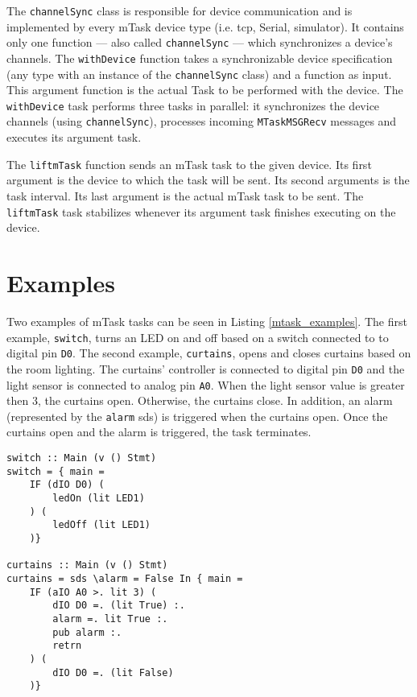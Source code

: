 The \texttt{channelSync} class is responsible for device communication and is implemented by every \gls{mTask} device type (i.e. \acs{tcp}, Serial, simulator). It contains only one function --- also called \texttt{channelSync} --- 
which synchronizes a device's channels. The \texttt{withDevice} function takes a synchronizable device specification (any type with an instance of the \texttt{channelSync} class) and a function as input. This argument function is the actual Task to be performed with the device. The \texttt{withDevice} task performs three tasks in parallel: it synchronizes the device channels (using \texttt{channelSync}), processes incoming \texttt{MTaskMSGRecv} messages and executes its argument task. 

The \texttt{liftmTask} function sends an \gls{mTask} task to the given device. Its first argument is the device to which the task will be sent. Its second arguments is the task interval. Its last argument is the actual \gls{mTask} task to be sent. The \texttt{liftmTask} task stabilizes whenever its argument task finishes executing on the device. 

\section{Examples}

Two examples of \gls{mTask} tasks can be seen in Listing \ref{mtask_examples}. The first example, \texttt{switch}, turns an LED on and off based on a switch connected to to digital pin \texttt{D0}. The second example, \texttt{curtains}, opens and closes curtains based on the room lighting. The curtains' controller is connected to digital pin \texttt{D0} and the light sensor is connected to analog pin \texttt{A0}. When the light sensor value is greater then 3, the curtains open. Otherwise, the curtains close. In addition, an alarm (represented by the \texttt{alarm} \ac{sds}) is triggered when the curtains open. Once the curtains open and the alarm is triggered, the task terminates.

\begin{lstlisting}[caption=Examples of mTask tasks,captionpos=b,label=mtask_examples]
switch :: Main (v () Stmt) 
switch = { main = 
	IF (dIO D0) (
		ledOn (lit LED1)
	) (
		ledOff (lit LED1)
	)}
	
curtains :: Main (v () Stmt)
curtains = sds \alarm = False In { main = 
	IF (aIO A0 >. lit 3) (
		dIO D0 =. (lit True) :.
		alarm =. lit True :.
		pub alarm :.
		retrn
	) (
		dIO D0 =. (lit False)
	)}
\end{lstlisting}





